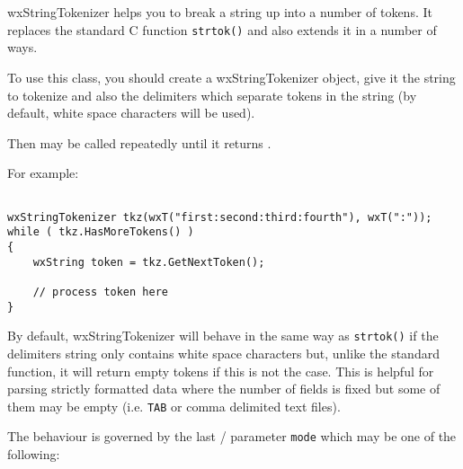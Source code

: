 \section{}\label{wxstringtokenizer}

wxStringTokenizer helps you to break a string up into a number of tokens. It
replaces the standard C function {\tt strtok()} and also extends it in a
number of ways.

To use this class, you should create a wxStringTokenizer object, give it the
string to tokenize and also the delimiters which separate tokens in the string
(by default, white space characters will be used).

Then  may be called
repeatedly until it  
returns \false.

For example:

\begin{verbatim}

wxStringTokenizer tkz(wxT("first:second:third:fourth"), wxT(":"));
while ( tkz.HasMoreTokens() )
{
    wxString token = tkz.GetNextToken();

    // process token here
}
\end{verbatim}

By default, wxStringTokenizer will behave in the same way as {\tt strtok()} if
the delimiters string only contains white space characters but, unlike the
standard function, it will return empty tokens if this is not the case. This
is helpful for parsing strictly formatted data where the number of fields is
fixed but some of them may be empty (i.e. {\tt TAB} or comma delimited text
files).

The behaviour is governed by the last 
/ 
parameter {\tt mode} which may be one of the following:

